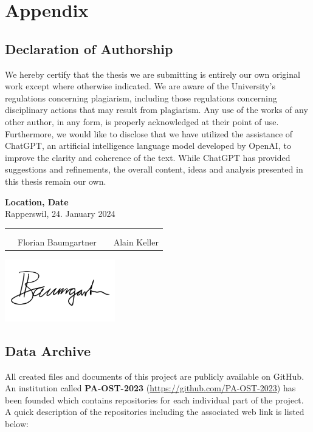 \chapter{Appendix}
\clearpage

\section{Declaration of Authorship} \label{Declaration of Authorship}
We hereby certify that the thesis we are submitting is entirely our own original work except where otherwise indicated.
We are aware of the University's regulations concerning plagiarism, including those regulations concerning disciplinary actions that may result from plagiarism.
Any use of the works of any other author, in any form, is properly acknowledged at their point of use.
Furthermore, we would like to disclose that we have utilized the assistance of ChatGPT, an artificial intelligence language model developed by OpenAI,
to improve the clarity and coherence of the text. While ChatGPT has provided suggestions and refinements,
the overall content, ideas and analysis presented in this thesis remain our own.

\bigskip
\textbf{Location, Date} \\
Rapperswil, 24. January 2024

\vspace{1.2cm}
\begin{tabular}{@{}p{0.1cm}p{6cm}p{0.6cm}p{6cm}@{}}
	 & \hrulefill          &  & \hrulefill   \\ \\[-0.7em]
	 & Florian Baumgartner &  & Alain Keller \\
\end{tabular}

\includegraphics[width=4.8cm, align=t, smash=br, hshift=0.9cm, vshift=2.55cm]{appendix/Signature_Florian_Baumgartner.pdf}
\newpage

\section{Data Archive} \label{Data Archive}
All created files and documents of this project are publicly available on GitHub. An institution called \textbf{PA-OST-2023} (\url{https://github.com/PA-OST-2023}) has been founded which contains repositories for each individual part of the project.
A quick description of the repositories including the associated web link is listed below:

